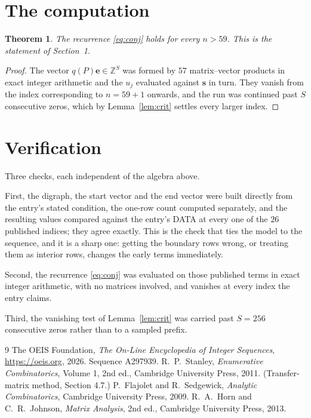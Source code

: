 \documentclass[11pt,a4paper]{article}
\theoremstyle{plain}
\newtheorem{theorem}{Theorem}
\theoremstyle{definition}
\begin{document}
\section{The computation}

\begin{theorem}
The recurrence \eqref{eq:conj} holds for every $n>59$. This is the statement of
Section~1.
\end{theorem}

\begin{proof}
The vector $q(P)\mathbf{e}\in\mathbb{Z}^{S}$ was formed by $57$ matrix--vector
products in exact integer arithmetic and the $u_j$ evaluated against $\mathbf{s}$ in turn.
They vanish from the index corresponding to $n=59+1$ onwards, and the run was continued
past $S$ consecutive zeros, which by Lemma~\ref{lem:crit} settles every larger index.
\end{proof}

\section{Verification}

Three checks, each independent of the algebra above.

First, the digraph, the start vector and the end vector were built directly from the
entry's stated condition, the one-row count computed separately, and the resulting values
compared against the entry's DATA at every one of the $26$ published indices; they
agree exactly. This is the check that ties the model to the sequence, and it is a sharp one:
getting the boundary rows wrong, or treating them as interior rows, changes the early terms
immediately.

Second, the recurrence \eqref{eq:conj} was evaluated on those published terms in exact
integer arithmetic, with no matrices involved, and vanishes at every index the entry claims.

Third, the vanishing test of Lemma~\ref{lem:crit} was carried past $S=256$ consecutive
zeros rather than to a sampled prefix.

\begin{thebibliography}{9}
 The OEIS Foundation, \emph{The On-Line Encyclopedia of Integer
Sequences}, \url{https://oeis.org}, 2026. Sequence A297939.
 R.~P.~Stanley, \emph{Enumerative Combinatorics}, Volume 1, 2nd ed.,
Cambridge University Press, 2011. (Transfer-matrix method, Section 4.7.)
 P.~Flajolet and R.~Sedgewick, \emph{Analytic Combinatorics}, Cambridge
University Press, 2009.
 R.~A.~Horn and C.~R.~Johnson, \emph{Matrix Analysis}, 2nd ed., Cambridge
University Press, 2013.
\end{thebibliography}
\end{document}
